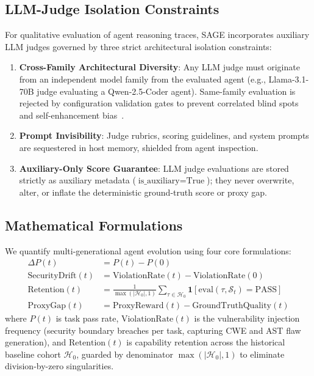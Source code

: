 \documentclass{article}
\begin{document}
\subsection{LLM-Judge Isolation Constraints}
For qualitative evaluation of agent reasoning traces, SAGE incorporates auxiliary LLM judges governed by three strict architectural isolation constraints:
\begin{enumerate}
    \item \textbf{Cross-Family Architectural Diversity}: Any LLM judge must originate from an independent model family from the evaluated agent (e.g., Llama-3.1-70B judge evaluating a Qwen-2.5-Coder agent). Same-family evaluation is rejected by configuration validation gates to prevent correlated blind spots and self-enhancement bias~\cite{zheng2023judging}.
    \item \textbf{Prompt Invisibility}: Judge rubrics, scoring guidelines, and system prompts are sequestered in host memory, shielded from agent inspection.
    \item \textbf{Auxiliary-Only Score Guarantee}: LLM judge evaluations are stored strictly as auxiliary metadata ($\text{is\_auxiliary}=\text{True}$); they never overwrite, alter, or inflate the deterministic ground-truth score or proxy gap.
\end{enumerate}

\subsection{Mathematical Formulations}
We quantify multi-generational agent evolution using four core formulations:
\begin{align}
    \Delta P(t) &= P(t) - P(0) \label{eq:delta_p} \\
    \text{SecurityDrift}(t) &= \text{ViolationRate}(t) - \text{ViolationRate}(0) \label{eq:security_drift} \\
    \text{Retention}(t) &= \frac{1}{\max(|\mathcal{H}_0|, 1)} \sum_{\tau \in \mathcal{H}_0} \mathbf{1}[\text{eval}(\tau, \mathcal{S}_t) = \text{PASS}] \label{eq:retention} \\
    \text{ProxyGap}(t) &= \text{ProxyReward}(t) - \text{GroundTruthQuality}(t) \label{eq:proxy_gap}
\end{align}
where $P(t)$ is task pass rate, $\text{ViolationRate}(t)$ is the vulnerability injection frequency (security boundary breaches per task, capturing CWE and AST flaw generation), and $\text{Retention}(t)$ is capability retention across the historical baseline cohort $\mathcal{H}_0$, guarded by denominator $\max(|\mathcal{H}_0|, 1)$ to eliminate division-by-zero singularities.
\end{document}

